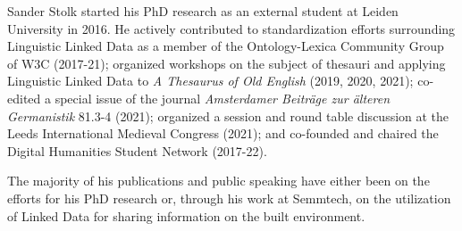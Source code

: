 Sander Stolk started his PhD research as an external student at Leiden University in 2016. %
He actively contributed to standardization efforts surrounding Linguistic Linked Data as a member of the Ontology-Lexica Community Group of W3C (2017-21); organized workshops on the subject of thesauri and applying Linguistic Linked Data to \textit{A Thesaurus of Old English} (2019, 2020, 2021); co-edited a special issue of the journal \textit{Amsterdamer Beiträge zur älteren Germanistik} 81.3-4 %
(2021); organized a session and round table discussion at the Leeds International Medieval Congress %
(2021); and co-founded and chaired the Digital Humanities Student Network %
(2017-22). %

The majority of his publications and public speaking have either been on the efforts for his PhD research or, through his work at Semmtech, on the utilization of Linked Data for sharing information on the built environment.
